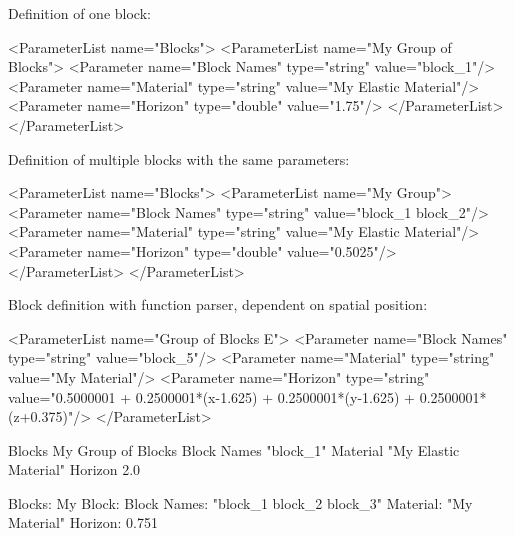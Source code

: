 
Definition of one block:

\begingroup
\lstset{breaklines=true}
\begin{code}
<ParameterList name="Blocks">
  <ParameterList name="My Group of Blocks">
    <Parameter name="Block Names" type="string" value="block_1"/>
    <Parameter name="Material" type="string" value="My Elastic Material"/>
    <Parameter name="Horizon" type="double" value="1.75"/>
  </ParameterList>
</ParameterList>
\end{code}
\endgroup

Definition of multiple blocks with the same parameters:

\begingroup
\lstset{breaklines=true}
\begin{code}
<ParameterList name="Blocks">
  <ParameterList name="My Group">
    <Parameter name="Block Names" type="string" value="block_1 block_2"/>
    <Parameter name="Material" type="string" value="My Elastic Material"/>
    <Parameter name="Horizon" type="double" value="0.5025"/>
  </ParameterList>
</ParameterList>
\end{code}
\endgroup

Block definition with function parser, dependent on spatial position:

\begingroup
\lstset{breaklines=true}
\begin{code}
<ParameterList name="Group of Blocks E">
  <Parameter name="Block Names" type="string" value="block_5"/>
  <Parameter name="Material" type="string" value="My Material"/>
  <Parameter name="Horizon" type="string" value="0.5000001 + 0.2500001*(x-1.625) + 0.2500001*(y-1.625) + 0.2500001*(z+0.375)"/>
</ParameterList> 
\end{code}
\endgroup


\begingroup
\lstset{breaklines=true}
\begin{code}
Blocks
  My Group of Blocks
    Block Names "block_1"
    Material "My Elastic Material"
    Horizon 2.0
\end{code}
\endgroup


\begingroup
\lstset{breaklines=true}
\begin{code}
Blocks:
  My Block:
    Block Names: "block_1 block_2 block_3"
    Material: "My Material"
    Horizon: 0.751
\end{code}
\endgroup
  


